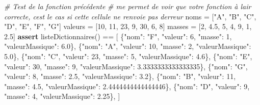 \documentclass[
  paper=a4,
  ,captions=tableheading
]{scrartcl}
\newenvironment{Shaded}{}{}
\newcommand{\CommentTok}[1]{\textcolor[rgb]{0.38,0.63,0.69}{\textit{#1}}}
\newcommand{\ControlFlowTok}[1]{\textcolor[rgb]{0.00,0.44,0.13}{\textbf{#1}}}
\newcommand{\DecValTok}[1]{\textcolor[rgb]{0.25,0.63,0.44}{#1}}
\newcommand{\FloatTok}[1]{\textcolor[rgb]{0.25,0.63,0.44}{#1}}
\newcommand{\NormalTok}[1]{#1}
\newcommand{\OperatorTok}[1]{\textcolor[rgb]{0.40,0.40,0.40}{#1}}
\newcommand{\StringTok}[1]{\textcolor[rgb]{0.25,0.44,0.63}{#1}}
\begin{document}
\begin{Shaded}
\begin{Highlighting}[]
\CommentTok{\# Test de la fonction précédente}
\CommentTok{\# me permet de voir que votre fonction à l\textquotesingle{}air correcte, c\textquotesingle{}est le cas si cette cellule ne renvoie pas d\textquotesingle{}erreur}
\NormalTok{noms }\OperatorTok{=}\NormalTok{ [}\StringTok{"A"}\NormalTok{, }\StringTok{"B"}\NormalTok{, }\StringTok{"C"}\NormalTok{, }\StringTok{"D"}\NormalTok{, }\StringTok{"E"}\NormalTok{, }\StringTok{"F"}\NormalTok{, }\StringTok{"G"}\NormalTok{]}
\NormalTok{valeurs }\OperatorTok{=}\NormalTok{ [}\DecValTok{10}\NormalTok{, }\DecValTok{11}\NormalTok{, }\DecValTok{23}\NormalTok{, }\DecValTok{9}\NormalTok{, }\DecValTok{30}\NormalTok{, }\DecValTok{6}\NormalTok{, }\DecValTok{8}\NormalTok{]}
\NormalTok{masses }\OperatorTok{=}\NormalTok{ [}\DecValTok{2}\NormalTok{, }\FloatTok{4.5}\NormalTok{, }\DecValTok{5}\NormalTok{, }\DecValTok{4}\NormalTok{, }\DecValTok{9}\NormalTok{, }\DecValTok{1}\NormalTok{, }\FloatTok{2.5}\NormalTok{]}
\ControlFlowTok{assert}\NormalTok{ listeDictionnaires() }\OperatorTok{==}\NormalTok{ [}
\NormalTok{    \{}\StringTok{"nom"}\NormalTok{: }\StringTok{"F"}\NormalTok{, }\StringTok{"valeur"}\NormalTok{: }\DecValTok{6}\NormalTok{, }\StringTok{"masse"}\NormalTok{: }\DecValTok{1}\NormalTok{, }\StringTok{"valeurMassique"}\NormalTok{: }\FloatTok{6.0}\NormalTok{\},}
\NormalTok{    \{}\StringTok{"nom"}\NormalTok{: }\StringTok{"A"}\NormalTok{, }\StringTok{"valeur"}\NormalTok{: }\DecValTok{10}\NormalTok{, }\StringTok{"masse"}\NormalTok{: }\DecValTok{2}\NormalTok{, }\StringTok{"valeurMassique"}\NormalTok{: }\FloatTok{5.0}\NormalTok{\},}
\NormalTok{    \{}\StringTok{"nom"}\NormalTok{: }\StringTok{"C"}\NormalTok{, }\StringTok{"valeur"}\NormalTok{: }\DecValTok{23}\NormalTok{, }\StringTok{"masse"}\NormalTok{: }\DecValTok{5}\NormalTok{, }\StringTok{"valeurMassique"}\NormalTok{: }\FloatTok{4.6}\NormalTok{\},}
\NormalTok{    \{}\StringTok{"nom"}\NormalTok{: }\StringTok{"E"}\NormalTok{, }\StringTok{"valeur"}\NormalTok{: }\DecValTok{30}\NormalTok{, }\StringTok{"masse"}\NormalTok{: }\DecValTok{9}\NormalTok{, }\StringTok{"valeurMassique"}\NormalTok{: }\FloatTok{3.3333333333333335}\NormalTok{\},}
\NormalTok{    \{}\StringTok{"nom"}\NormalTok{: }\StringTok{"G"}\NormalTok{, }\StringTok{"valeur"}\NormalTok{: }\DecValTok{8}\NormalTok{, }\StringTok{"masse"}\NormalTok{: }\FloatTok{2.5}\NormalTok{, }\StringTok{"valeurMassique"}\NormalTok{: }\FloatTok{3.2}\NormalTok{\},}
\NormalTok{    \{}\StringTok{"nom"}\NormalTok{: }\StringTok{"B"}\NormalTok{, }\StringTok{"valeur"}\NormalTok{: }\DecValTok{11}\NormalTok{, }\StringTok{"masse"}\NormalTok{: }\FloatTok{4.5}\NormalTok{, }\StringTok{"valeurMassique"}\NormalTok{: }\FloatTok{2.4444444444444446}\NormalTok{\},}
\NormalTok{    \{}\StringTok{"nom"}\NormalTok{: }\StringTok{"D"}\NormalTok{, }\StringTok{"valeur"}\NormalTok{: }\DecValTok{9}\NormalTok{, }\StringTok{"masse"}\NormalTok{: }\DecValTok{4}\NormalTok{, }\StringTok{"valeurMassique"}\NormalTok{: }\FloatTok{2.25}\NormalTok{\},}
\NormalTok{]}
\end{Highlighting}
\end{Shaded}
\end{document}
